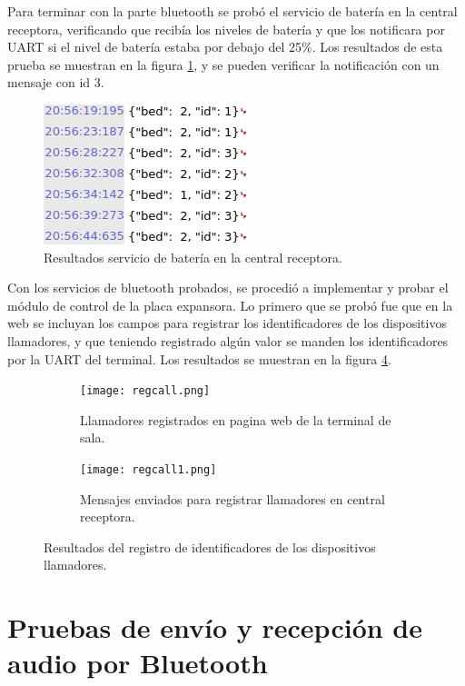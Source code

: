 Para terminar con la parte bluetooth se probó el servicio de batería en la central receptora, verificando que recibía los niveles de batería y que los notificara por UART si el nivel de batería estaba por debajo del 25\%. Los resultados de esta prueba se muestran en la figura \ref{fig:Pbas2}, y se pueden verificar la notificación con un mensaje con id 3.

\begin{figure}[htpb]
	\centering
	\includegraphics[scale=0.7]{./Figures/Pbas2.png}	
	\caption{Resultados servicio de batería en la central receptora.}
	\label{fig:Pbas2}
\end{figure}

Con los servicios de bluetooth probados, se procedió a implementar y probar el módulo de control de la placa expansora. Lo primero que se probó fue que en la web se incluyan los campos para registrar los identificadores de los dispositivos llamadores, y que teniendo registrado algún valor se manden los identificadores por la UART del terminal. Los resultados se muestran en la figura \ref{fig:Pllam}.

\begin{figure}[htpb]
	\centering
   	\begin{subfigure}[b]{1\textwidth}
   		\centering
      	\texttt{[image: regcall.png]}
      	\caption{Llamadores registrados en pagina web de la terminal de sala.}
      	\label{fig:PllamA}
   	\end{subfigure}%
   	\newline
   	\begin{subfigure}[b]{1\textwidth}
   		\centering
      	\texttt{[image: regcall1.png]}
      	\caption{Mensajes enviados para registrar llamadores en central receptora.}
      	\label{fig:PllamB}
   	\end{subfigure}%
	\caption{Resultados del registro de identificadores de los dispositivos llamadores.}
	\label{fig:Pllam}
\end{figure}

\section{Pruebas de envío y recepción de audio por Bluetooth}
\label{sec:pruebasACS}

